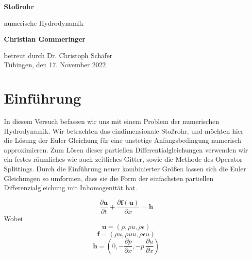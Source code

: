\documentclass[12pt]{article}
\begin{document}
\begin{titlepage}
    \begin{center}
        \vspace*{1cm}
            
        \Huge
        \textbf{Stoßrohr}
            
        
        \large
        
            
        \vspace{0.7cm}
            numerische Hydrodynamik
        \vspace{2cm}
        

        \textbf{Christian Gommeringer}
            
        \vspace*{7cm}
        
        
            
        
              
        
            
        
            
        \normalsize
        betreut durch Dr. Christoph Schäfer\\
        \vspace*{1cm}
        Tübingen, den 17. November 2022
        
            
    \end{center}
\end{titlepage}



\section{Einführung}
In diesem Versuch befassen wir uns mit einem Problem der numerischen Hydrodynamik. Wir betrachten das eindimensionale Stoßrohr, und möchten hier die Lösung der  Euler Gleichung für eine unstetige Anfangsbedingung numerisch approximieren. Zum Lösen dieser partiellen Differentialgleichungen verwenden wir ein festes räumliches wie auch zeitliches Gitter, sowie die Methode des Operator Splittings. Durch die Einführung neuer kombinierter Größen lassen sich die Euler Gleichungen so umformen, dass sie die Form der einfachsten partiellen Differenzialgleichung mit Inhomogenität hat.

\begin{equation*}\frac{\partial\textbf{u}}{\partial{t}}+\frac{\partial\textbf{f}(\textbf{u})}{\partial{x}}=\textbf{h}\end{equation*}
Wobei $$\textbf{u}=(\rho,\rho{u},\rho\epsilon)$$
$$\textbf{f}=(\rho{u},\rho{uu},\rho\epsilon{u})$$ 
$$\textbf{h}=\left(0,-\frac{\partial{p}}{\partial{x}},-p\,\frac{\partial{u}}{\partial{x}}\right)$$
\end{document}
